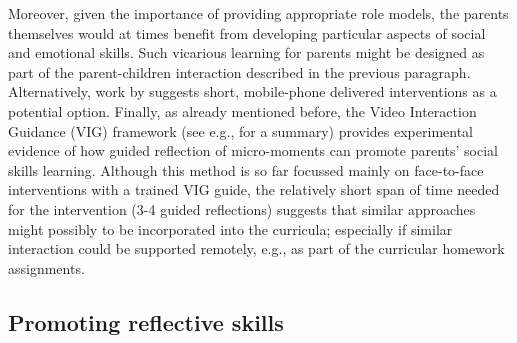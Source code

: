 \documentclass[prodmode,acmtochi]{acmsmall}
\newcommand{\Geraldine}[1]{\textrm{\textbf{\textcolor{Orange}{[[#1]]}}}}
\newcommand{\GeraldineFIXNEW}[1]{}
\begin{document}
Moreover, given the importance of providing appropriate role models, the parents themselves would at times benefit from developing particular aspects of social and emotional skills. Such vicarious learning for parents might be designed as part of the parent-children interaction described in the previous paragraph. Alternatively, work by \cite{Pina2014,Paredes2014} suggests short, mobile-phone delivered interventions as a potential option. Finally, as already mentioned before, the Video Interaction Guidance (VIG) framework (see e.g., \cite{Kennedy2011} for a summary) provides experimental evidence of how guided reflection of micro-moments can promote parents' social skills learning. Although this method is so far focussed mainly on face-to-face interventions with a trained VIG guide, the relatively short span of time needed for the intervention (3-4 guided reflections) suggests that similar approaches might possibly to be incorporated into the curricula; especially if similar interaction could be supported remotely, e.g., as part of the curricular homework assignments.
%
\GeraldineFIXNEW{GF NOTE: given your role model example at the start - make more of the vicarious learning that cna also take place for the parents ie in learning what their children are learning so that they can reinforce and support, they are also learning themselves and so are more likely to be better role models - so SUPPORT in two ways, active support and role model support. }








                 

\subsection{Promoting reflective skills}
\label{sec:feedback}
 
\end{document}
